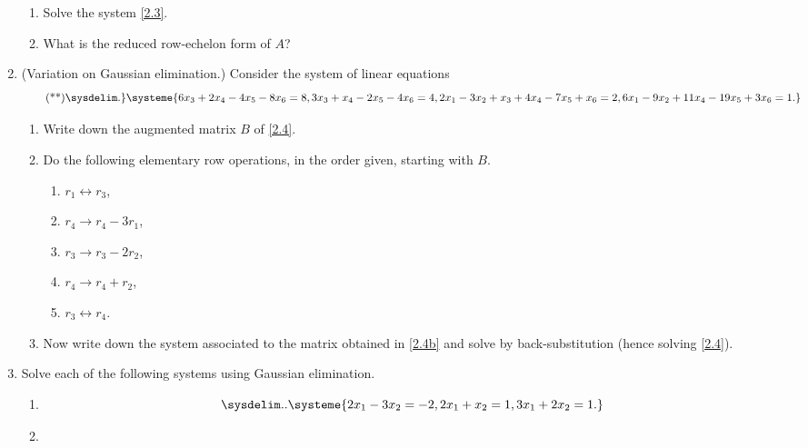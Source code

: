 \documentclass[english,12pt,a4paper]{scrartcl}
\begin{document}
\begin{enumerate}
\begin{enumerate}[label=(\alph*)]
      \item Solve the system \eqref{2.3}.
      \item What is the reduced row-echelon form of $A$?
    \end{enumerate}
  \item (Variation on Gaussian elimination.) Consider the system of linear 
    equations
    \begin{equation} \label{2.4} \tag{**}
      \sysdelim.\}\systeme{
        6x_3 + 2x_4 - 4x_5 - 8x_6 = 8,
        3x_3 + x_4 - 2x_5 - 4x_6 = 4,
        2x_1 - 3x_2 + x_3 + 4x_4 - 7x_5 + x_6 = 2,
        6x_1 - 9x_2 + 11x_4 - 19x_5 + 3x_6 = 1.
      }
    \end{equation}
    \begin{enumerate}[label=(\alph*), ref=(\alph*)]
      \item  Write down the augmented matrix $B$ of \eqref{2.4}.
      \item \label{2.4b} Do the following elementary row operations, in the 
        order given, starting with $B$.
        \begin{multicols}{3}[\setlength{\columnseprule}{0pt}]
          \begin{enumerate}[label=(\roman*)]
            \item $r_1 \leftrightarrow r_3$,
            \item $r_4 \to r_4 - 3r_1$,
            \item $r_3 \to r_3 - 2r_2$,
            \item $r_4 \to r_4 + r_2$,
            \item $r_3 \leftrightarrow r_4$.
          \end{enumerate}
        \end{multicols}
      \item Now write down the system associated to the matrix obtained in 
        \ref{2.4b} and solve by back-substitution (hence solving 
        \eqref{2.4}).
    \end{enumerate}
  \item Solve each of the following systems using Gaussian elimination.
    \begin{multicols}{2}[\setlength{\columnseprule}{0pt}]
      \begin{enumerate}
        \item
          \[
            \sysdelim..\systeme{
              2x_1 - 3x_2 = -2,
              2x_1 + x_2 = 1,
              3x_1 + 2x_2 = 1.
            }
          \]
        \item

\end{enumerate}
\end{multicols}
\end{enumerate}
\end{document}
